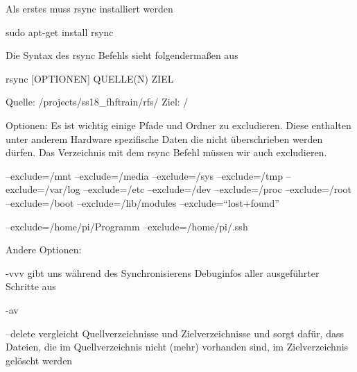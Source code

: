 \documentclass [a4paper,10pt] {article}
\begin{document}
			Als erstes muss rsync installiert werden
			
			sudo apt-get install rsync 
			
			Die Syntax des rsync Befehls sieht folgendermaßen aus
			
			rsync [OPTIONEN] QUELLE(N) ZIEL 
			
			Quelle: /projects/ss18\_fhftrain/rfs/
			Ziel: /
			
			Optionen:
			Es ist wichtig einige Pfade und Ordner zu excludieren. Diese enthalten unter anderem Hardware spezifische Daten die nicht überschrieben werden dürfen. Das Verzeichnis mit dem rsync Befehl müssen wir auch excludieren. 
			
			--exclude=/mnt 
			--exclude=/media 
			--exclude=/sys 
			--exclude=/tmp 
			--exclude=/var/log 
			--exclude=/etc 
			--exclude=/dev 
			--exclude=/proc 
			--exclude=/root 
			--exclude=/boot 
			--exclude=/lib/modules 
			--exclude=``lost+found''
			
			--exclude=/home/pi/Programm 
			--exclude=/home/pi/.ssh 
			
			Andere Optionen:
			
			-vvv
			gibt uns während des Synchronisierens Debuginfos aller ausgeführter Schritte aus 
			
			-av
			
			--delete
			vergleicht Quellverzeichnisse und Zielverzeichnisse und sorgt dafür, dass Dateien, die im Quellverzeichnis nicht (mehr) vorhanden sind, im Zielverzeichnis gelöscht werden			
		
		\vfill
		
\newpage
\end{document}
